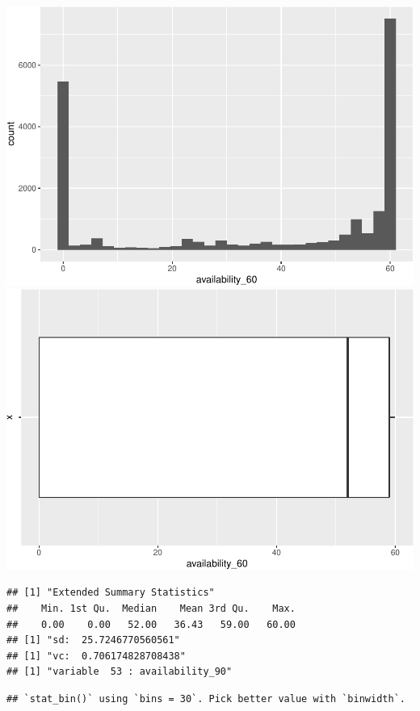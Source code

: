 \includegraphics{anal_files/figure-latex/unnamed-chunk-9-30.pdf}
\includegraphics{anal_files/figure-latex/unnamed-chunk-9-31.pdf}

\begin{verbatim}
## [1] "Extended Summary Statistics"
##    Min. 1st Qu.  Median    Mean 3rd Qu.    Max. 
##    0.00    0.00   52.00   36.43   59.00   60.00 
## [1] "sd:  25.7246770560561"
## [1] "vc:  0.706174828708438"
## [1] "variable  53 : availability_90"
\end{verbatim}

\begin{verbatim}
## `stat_bin()` using `bins = 30`. Pick better value with `binwidth`.
\end{verbatim}

